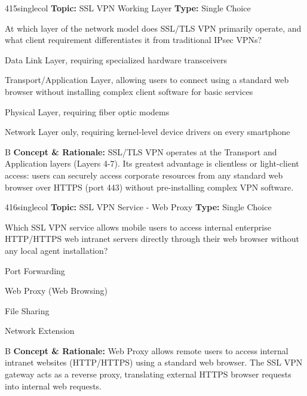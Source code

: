 \begin{qcard}{415}{singlecol}
\textcolor{darkslate!75}{\small\textbf{Topic:} SSL VPN Working Layer \hfill \textbf{Type:} Single Choice}\vspace{0.4em}\par
At which layer of the network model does SSL/TLS VPN primarily operate, and what client requirement differentiates it from traditional IPsec VPNs?
\begin{qoptions}
\item Data Link Layer, requiring specialized hardware transceivers
\item Transport/Application Layer, allowing users to connect using a standard web browser without installing complex client software for basic services
\item Physical Layer, requiring fiber optic modems
\item Network Layer only, requiring kernel-level device drivers on every smartphone
\end{qoptions}
\end{qcard}
\nopagebreak
\begin{explainbox}{B}
\textbf{Concept \& Rationale:} SSL/TLS VPN operates at the Transport and Application layers (Layers 4-7). Its greatest advantage is clientless or light-client access: users can securely access corporate resources from any standard web browser over HTTPS (port 443) without pre-installing complex VPN software.
\end{explainbox}

\begin{qcard}{416}{singlecol}
\textcolor{darkslate!75}{\small\textbf{Topic:} SSL VPN Service - Web Proxy \hfill \textbf{Type:} Single Choice}\vspace{0.4em}\par
Which SSL VPN service allows mobile users to access internal enterprise HTTP/HTTPS web intranet servers directly through their web browser without any local agent installation?
\begin{qoptions}
\item Port Forwarding
\item Web Proxy (Web Browsing)
\item File Sharing
\item Network Extension
\end{qoptions}
\end{qcard}
\nopagebreak
\begin{explainbox}{B}
\textbf{Concept \& Rationale:} Web Proxy allows remote users to access internal intranet websites (HTTP/HTTPS) using a standard web browser. The SSL VPN gateway acts as a reverse proxy, translating external HTTPS browser requests into internal web requests.
\end{explainbox}

